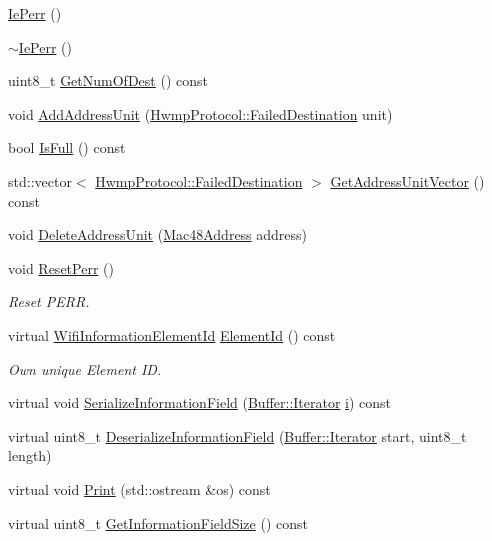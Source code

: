 \begin{DoxyCompactItemize}
\item 
\hyperlink{classns3_1_1dot11s_1_1IePerr_ab42fb02fbe287bbe13842d67c9906d13}{Ie\+Perr} ()
\item 
\hyperlink{classns3_1_1dot11s_1_1IePerr_a0f7839037bfcfd0d2a21c2021c754dbb}{$\sim$\+Ie\+Perr} ()
\item 
uint8\+\_\+t \hyperlink{classns3_1_1dot11s_1_1IePerr_af05a56877e21d8334814d95e962e6801}{Get\+Num\+Of\+Dest} () const 
\item 
void \hyperlink{classns3_1_1dot11s_1_1IePerr_aa9c2baf90c75cf736d4b7b66cba3dd76}{Add\+Address\+Unit} (\hyperlink{structns3_1_1dot11s_1_1HwmpProtocol_1_1FailedDestination}{Hwmp\+Protocol\+::\+Failed\+Destination} unit)
\item 
bool \hyperlink{classns3_1_1dot11s_1_1IePerr_af1772ffa4fbaa4b0edfb14ddf2065053}{Is\+Full} () const 
\item 
std\+::vector$<$ \hyperlink{structns3_1_1dot11s_1_1HwmpProtocol_1_1FailedDestination}{Hwmp\+Protocol\+::\+Failed\+Destination} $>$ \hyperlink{classns3_1_1dot11s_1_1IePerr_abf37cf6070e8f170c468f3fd02eb21dc}{Get\+Address\+Unit\+Vector} () const 
\item 
void \hyperlink{classns3_1_1dot11s_1_1IePerr_a270521d259e48755ac81ce779815e452}{Delete\+Address\+Unit} (\hyperlink{classns3_1_1Mac48Address}{Mac48\+Address} address)
\item 
void \hyperlink{classns3_1_1dot11s_1_1IePerr_aa8a0d07f947b95599ee13af53c2c955b}{Reset\+Perr} ()
\begin{DoxyCompactList}\small\item\em Reset P\+E\+RR. \end{DoxyCompactList}\item 
virtual \hyperlink{namespacens3_aeb185e0c8a60816016bca079f1420478}{Wifi\+Information\+Element\+Id} \hyperlink{classns3_1_1dot11s_1_1IePerr_ab04681642ebb76d8f1f9a73a5e767955}{Element\+Id} () const 
\begin{DoxyCompactList}\small\item\em Own unique Element ID. \end{DoxyCompactList}\item 
virtual void \hyperlink{classns3_1_1dot11s_1_1IePerr_a22782a754453641128314cb87a01ba39}{Serialize\+Information\+Field} (\hyperlink{classns3_1_1Buffer_1_1Iterator}{Buffer\+::\+Iterator} \hyperlink{lte__uplink__power__control_8m_a6f6ccfcf58b31cb6412107d9d5281426}{i}) const 
\item 
virtual uint8\+\_\+t \hyperlink{classns3_1_1dot11s_1_1IePerr_a1fbb240ad4b0dfc2a7b93b917016cc88}{Deserialize\+Information\+Field} (\hyperlink{classns3_1_1Buffer_1_1Iterator}{Buffer\+::\+Iterator} start, uint8\+\_\+t length)
\item 
virtual void \hyperlink{classns3_1_1dot11s_1_1IePerr_af5c0574c369c7a85770762f5ebc779a3}{Print} (std\+::ostream \&os) const 
\item 
virtual uint8\+\_\+t \hyperlink{classns3_1_1dot11s_1_1IePerr_a226d154eae227a6f883b63172de4c906}{Get\+Information\+Field\+Size} () const 
\end{DoxyCompactItemize}
